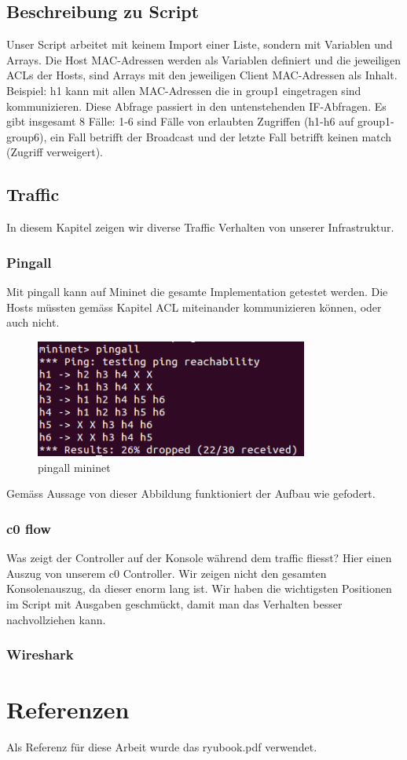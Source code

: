 \documentclass[a4,12pt]{scrartcl}
\begin{document}
\subsection{Beschreibung zu Script}
Unser Script arbeitet mit keinem Import einer Liste, sondern mit Variablen und Arrays. Die Host MAC-Adressen werden als Variablen definiert und die jeweiligen ACLs der Hosts, sind Arrays mit den jeweiligen Client MAC-Adressen als Inhalt. Beispiel: h1 kann mit allen MAC-Adressen die in group1 eingetragen sind kommunizieren. Diese Abfrage passiert in den untenstehenden IF-Abfragen. Es gibt insgesamt 8 Fälle: 1-6 sind Fälle von erlaubten Zugriffen (h1-h6 auf group1-group6), ein Fall betrifft der Broadcast und der letzte Fall betrifft keinen match (Zugriff verweigert). 

\subsection{Traffic}
In diesem Kapitel zeigen wir diverse Traffic Verhalten von unserer Infrastruktur. 

\subsubsection{Pingall}
Mit pingall kann auf Mininet die gesamte Implementation getestet werden. Die Hosts müssten gemäss Kapitel ACL miteinander kommunizieren können, oder auch nicht. 
\begin{figure} [H]
	\begin{center}
	\includegraphics[width=0.80\textwidth]{./pictures/pingall.png}
	\caption{pingall mininet}
	\label{x}
	\end{center}
\end{figure} 
Gemäss Aussage von dieser Abbildung funktioniert der Aufbau wie gefodert. 

\subsubsection{c0 flow}
Was zeigt der Controller auf der Konsole während dem traffic fliesst? Hier einen Auszug von unserem c0 Controller. Wir zeigen nicht den gesamten Konsolenauszug, da dieser enorm lang ist. Wir haben die wichtigsten Positionen im Script mit Ausgaben geschmückt, damit man das Verhalten besser nachvollziehen kann. 


\subsubsection{Wireshark}


\section{Referenzen}
Als Referenz für diese Arbeit wurde das ryubook.pdf verwendet. 
\end{document}
